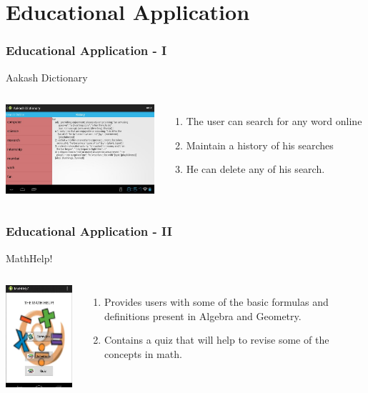 \documentclass[12pt]{beamer}
\begin{document}
\section{Educational Application}
\begin{frame}[c]
\frametitle{Educational Application - I}
\begin{block}{Aakash Dictionary}
 \begin{columns}[c]
   \includegraphics[width=5.5cm]{./app3.jpg}
  \begin{enumerate}
   \item \vskip-20pt The user can search for any word online
   \item Maintain a history of his searches
   \item He can delete any of his search.
   \end{enumerate} 
 \end{columns}
\end{block}
\end{frame}

\begin{frame}[c]
\frametitle{Educational Application - II}
\begin{block}{MathHelp!}
 \begin{columns}[c]
   \includegraphics[width=4cm]{./app2.jpg}
  \begin{enumerate}
  \item \vskip-35pt Provides users with some of the basic formulas and definitions present in Algebra and Geometry.
  \item Contains a quiz that will help to revise some of the concepts in math.
 \end{enumerate}
 \end{columns}
\end{block}
\end{frame}
\end{document}
